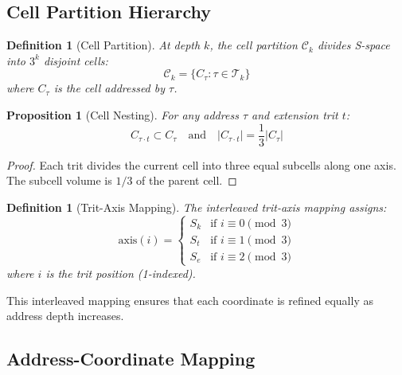 \documentclass[twocolumn,10pt]{article}
\newtheorem{definition}[theorem]{Definition}
\newtheorem{proposition}[theorem]{Proposition}
\begin{document}
\subsection{Cell Partition Hierarchy}

\begin{definition}[Cell Partition]
At depth $k$, the cell partition $\mathcal{C}_k$ divides S-space into $3^k$ disjoint cells:
\begin{equation}
\mathcal{C}_k = \{C_\tau : \tau \in \mathcal{T}_k\}
\end{equation}
where $C_\tau$ is the cell addressed by $\tau$.
\end{definition}

\begin{proposition}[Cell Nesting]
For any address $\tau$ and extension trit $t$:
\begin{equation}
C_{\tau \cdot t} \subset C_\tau \quad \text{and} \quad |C_{\tau \cdot t}| = \frac{1}{3}|C_\tau|
\end{equation}
\end{proposition}

\begin{proof}
Each trit divides the current cell into three equal subcells along one axis. The subcell volume is $1/3$ of the parent cell.
\end{proof}

\begin{definition}[Trit-Axis Mapping]
The interleaved trit-axis mapping assigns:
\begin{equation}
\text{axis}(i) = \begin{cases}
S_k & \text{if } i \equiv 0 \pmod{3} \\
S_t & \text{if } i \equiv 1 \pmod{3} \\
S_e & \text{if } i \equiv 2 \pmod{3}
\end{cases}
\end{equation}
where $i$ is the trit position (1-indexed).
\end{definition}

This interleaved mapping ensures that each coordinate is refined equally as address depth increases.

\subsection{Address-Coordinate Mapping}
\end{document}
